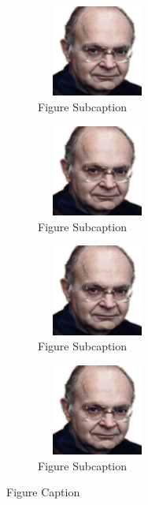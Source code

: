 \documentclass[11pt, english]{article}
\begin{document}
	\begin{figure}[H]
	\begin{center}
		\begin{subfigure}[t]{5cm}
		\begin{center}
			\includegraphics[width=4cm,height=3cm]{../Blog/Photos_FF/knuth.png}
		\end{center}
			\caption{Figure Subcaption}
		\end{subfigure}
                \begin{subfigure}[t]{5cm}
                \begin{center}
                        \includegraphics[width=4cm,height=3cm]{../Blog/Photos_FF/knuth.png}
                \end{center}
                        \caption{Figure Subcaption}
                \end{subfigure}
	\quad
		\begin{subfigure}[t]{5cm}
		\begin{center}
			\includegraphics[width=4cm,height=3cm]{../Blog/Photos_FF/knuth.png}
		\end{center}
			\caption{Figure Subcaption}
		\end{subfigure}
                \begin{subfigure}[t]{5cm}
                \begin{center}
			\includegraphics[width=4cm,height=3cm]{../Blog/Photos_FF/knuth.png}
                \end{center}
                        \caption{Figure Subcaption}
                \end{subfigure}
	\end{center}
		\caption{Figure Caption}
	\end{figure}
\end{document}
